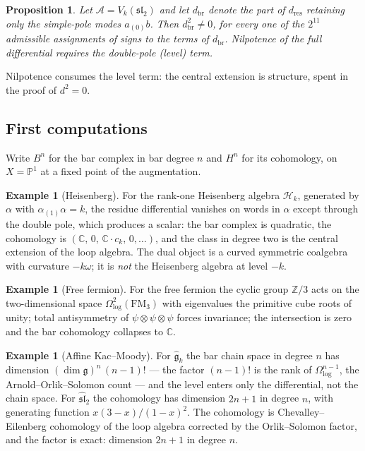 \documentclass[11pt]{amsart}
\numberwithin{equation}{section}
\theoremstyle{plain}
\newtheorem{proposition}[theorem]{Proposition}
\theoremstyle{definition}
\newtheorem{example}[theorem]{Example}
\theoremstyle{remark}
\newcommand{\cA}{\mathcal{A}}
\newcommand{\bC}{\mathbb{C}}
\newcommand{\bZ}{\mathbb{Z}}
\newcommand{\fg}{\mathfrak{g}}
\newcommand{\FM}{\mathrm{FM}}
\begin{document}
\begin{proposition}\label{prop:bracket-fails}
Let $\cA=V_k(\mathfrak{sl}_2)$ and let $d_{\mathrm{br}}$ denote the part
of $d_{\mathrm{res}}$ retaining only the simple-pole modes $a_{(0)}b$.
Then $d_{\mathrm{br}}^{2}\neq0$, for every one of the $2^{11}$ admissible
assignments of signs to the terms of $d_{\mathrm{br}}$. Nilpotence of the
full differential requires the double-pole (level) term.
\end{proposition}

Nilpotence consumes the level term: the central extension is
structure, spent in the proof of $d^{2}=0$.

\subsection{First computations}

Write $B^{n}$ for the bar complex in bar degree $n$ and $H^{n}$ for its
cohomology, on $X=\mathbb{P}^{1}$ at a fixed point of the augmentation.

\begin{example}[Heisenberg]\label{ex:heisenberg}
For the rank-one Heisenberg algebra $\mathcal{H}_k$, generated by $\alpha$
with $\alpha_{(1)}\alpha=k$, the residue differential vanishes on words in
$\alpha$ except through the double pole, which produces a scalar: the bar
complex is quadratic, the cohomology is
$(\bC,\,0,\,\bC\!\cdot\!c_k,\,0,\dots)$, and the class in degree two is the
central extension of the loop algebra. The dual object is a curved
symmetric coalgebra with curvature $-k\omega$; it is \emph{not} the
Heisenberg algebra at level $-k$.
\end{example}

\begin{example}[Free fermion]
For the free fermion the cyclic group $\bZ/3$ acts on the two-dimensional
space $\Omega^2_{\log}(\FM_3)$ with eigenvalues the primitive cube roots of
unity; total antisymmetry of $\psi\otimes\psi\otimes\psi$ forces invariance;
the intersection is zero and the bar cohomology collapses to $\bC$.
\end{example}

\begin{example}[Affine Kac--Moody]\label{ex:km}
For $\widehat{\fg}_k$ the bar chain space in degree $n$ has dimension
$(\dim\fg)^{n}\,(n-1)!$ --- the factor $(n-1)!$ is the rank of
$\Omega^{n-1}_{\log}$, the Arnold--Orlik--Solomon count --- and the level
enters only the differential, not the chain space. For
$\widehat{\mathfrak{sl}}_2$ the cohomology has dimension $2n+1$ in degree
$n$, with generating function $x(3-x)/(1-x)^2$. The cohomology is
Chevalley--Eilenberg cohomology of the loop algebra corrected by the
Orlik--Solomon factor, and the factor is exact: dimension $2n+1$ in
degree $n$.
\end{example}
\end{document}
